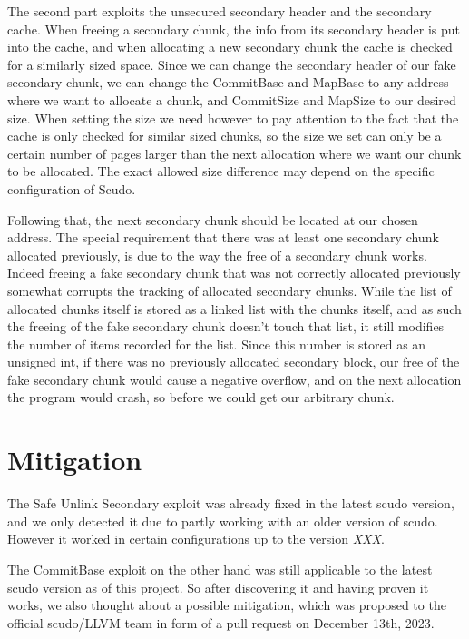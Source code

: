 \documentclass[a4paper,11pt,oneside]{report}
\begin{document}
The second part exploits the unsecured secondary header and the secondary cache. When
freeing a secondary chunk, the info from its secondary header is put into the cache, and
when allocating a new secondary chunk the cache is checked for a similarly sized
space. Since we can change the secondary header of our fake secondary chunk, we can change
the CommitBase and MapBase to any address where we want to allocate a chunk, and
CommitSize and MapSize to our desired size. When setting the size we need however to pay
attention to the fact that the cache is only checked for similar sized chunks, so the size
we set can only be a certain number of pages larger than the next allocation where we want
our chunk to be allocated. The exact allowed size difference may depend on the specific
configuration of Scudo.

Following that, the next secondary chunk should be located at our chosen address. The
special requirement that there was at least one secondary chunk allocated previously, is
due to the way the free of a secondary chunk works. Indeed freeing a fake secondary chunk
that was not correctly allocated previously somewhat corrupts the tracking of allocated
secondary chunks. While the list of allocated chunks itself is stored as a linked list
with the chunks itself, and as such the freeing of the fake secondary chunk doesn't touch
that list, it still modifies the number of items recorded for the list. Since this number
is stored as an unsigned int, if there was no previously allocated secondary block, our
free of the fake secondary chunk would cause a negative overflow, and on the next
allocation the program would crash, so before we could get our arbitrary chunk.


\chapter{Mitigation}

The Safe Unlink Secondary exploit was already fixed in the latest scudo version, and we
only detected it due to partly working with an older version of scudo. However it worked
in certain configurations up to the version \emph{XXX}.

The CommitBase exploit on the other hand was still applicable to the latest scudo version
as of this project. So after discovering it and having proven it works, we also thought
about a possible mitigation, which was proposed to the official scudo/LLVM team in form of
a pull request on December 13th, 2023.
\end{document}
